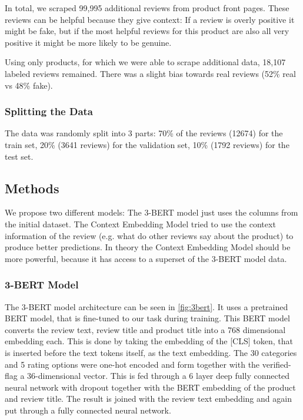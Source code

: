 \documentclass[utf8x]{ctexart}
\begin{document}
In total, we scraped 99,995 additional reviews from product front pages. These reviews can be helpful because they give context: If a review is overly positive it might be fake, but if the most helpful reviews for this product are also all very positive it might be more likely to be genuine.

Using only products, for which we were able to scrape additional data, 18,107 labeled reviews remained.
There was a slight bias towards real reviews (52\% real vs 48\% fake).

\subsubsection{Splitting the Data}

The data was randomly split into 3 parts: 70\% of the reviews (12674) for the train set, 20\% (3641 reviews) for the validation set, 10\% (1792 reviews) for the test set.

\subsection{Methods}

We propose two different models: The 3-BERT model just uses the columns from the initial dataset. The Context Embedding Model tried to use the context information of the review (e.g. what do other reviews say about the product) to produce better predictions. In theory the Context Embedding Model should be more powerful, because it has access to a superset of the 3-BERT model data.

\subsubsection{3-BERT Model}

The 3-BERT model architecture can be seen in \ref{fig:3bert}. It uses a pretrained BERT model, that is fine-tuned to our task during training. This BERT model converts the review text, review title and product title into a 768 dimensional embedding each. This is done by taking the embedding of the [CLS] token, that is inserted before the text tokens itself, as the text embedding.
The 30 categories and 5 rating options were one-hot encoded and form together with the verified-flag a 36-dimensional vector. This is fed through a 6 layer deep fully connected neural network with dropout together with the BERT embedding of the product and review title. The result is joined with the review text embedding and again put through a fully connected neural network.
\end{document}
